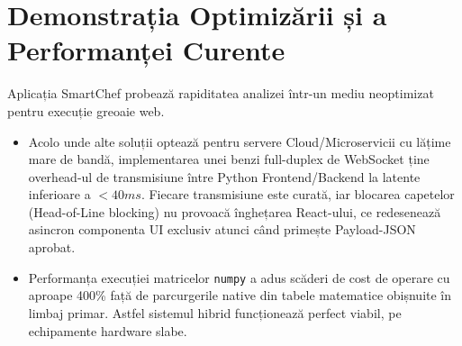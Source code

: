 \documentclass[12pt,a4paper]{article}
\begin{document}
\section{Demonstrația Optimizării și a Performanței Curente}

Aplicația SmartChef probează rapiditatea analizei într-un mediu neoptimizat pentru execuție greoaie web.

\begin{itemize}
    \item Acolo unde alte soluții optează pentru servere Cloud/Microservicii cu lățime mare de bandă, implementarea unei benzi full-duplex de WebSocket ține overhead-ul de transmisiune între Python Frontend/Backend la latente inferioare a $< 40ms$. Fiecare transmisiune este curată, iar blocarea capetelor (Head-of-Line blocking) nu provoacă înghețarea React-ului, ce redesenează asincron componenta UI exclusiv atunci când primește Payload-JSON aprobat.
    \item Performanța execuției matricelor \texttt{numpy} a adus scăderi de cost de operare cu aproape 400\% față de parcurgerile native din tabele matematice obișnuite în limbaj primar. Astfel sistemul hibrid funcționează perfect viabil, pe echipamente hardware slabe.
\end{itemize}
\end{document}
